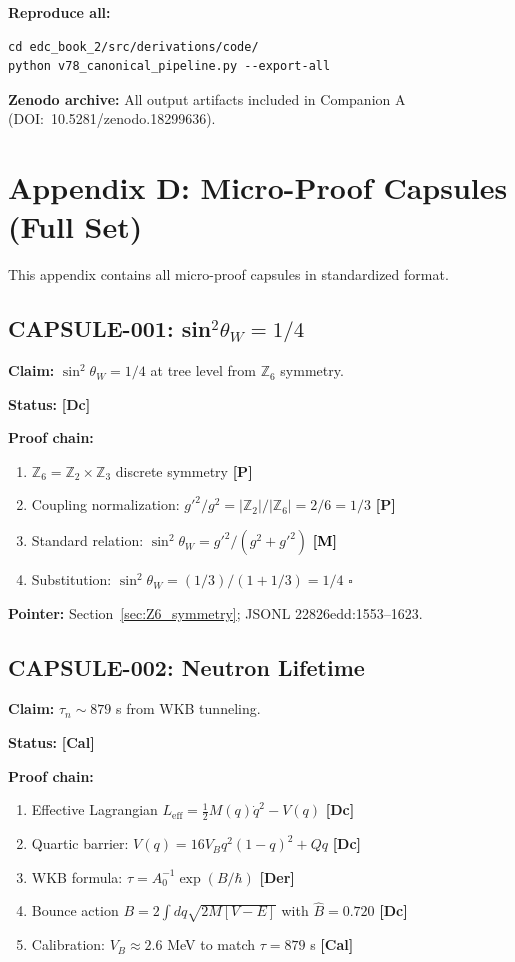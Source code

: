 \documentclass[11pt,a4paper]{article}
\newcommand{\tagP}{\textcolor{red!70!black}{\textbf{[P]}}}
\newcommand{\tagDc}{\textcolor{blue!70!black}{\textbf{[Dc]}}}
\newcommand{\tagDer}{\textcolor{green!50!black}{\textbf{[Der]}}}
\newcommand{\tagCal}{\textcolor{purple!70!black}{\textbf{[Cal]}}}
\newcommand{\tagM}{\textcolor{black}{\textbf{[M]}}}
\begin{document}
\textbf{Reproduce all:}
\begin{verbatim}
cd edc_book_2/src/derivations/code/
python v78_canonical_pipeline.py --export-all
\end{verbatim}

\textbf{Zenodo archive:} All output artifacts included in Companion A (DOI:~10.5281/zenodo.18299636).

\section{Appendix D: Micro-Proof Capsules (Full Set)}
\label{app:capsules}

This appendix contains all micro-proof capsules in standardized format.

\subsection{CAPSULE-001: sin$^2\theta_W = 1/4$}

\textbf{Claim:} $\sin^2\theta_W = 1/4$ at tree level from $\mathbb{Z}_6$ symmetry.

\textbf{Status:} \tagDc{}

\textbf{Proof chain:}
\begin{enumerate}
    \item $\mathbb{Z}_6 = \mathbb{Z}_2 \times \mathbb{Z}_3$ discrete symmetry \tagP{}
    \item Coupling normalization: $g'^2/g^2 = |\mathbb{Z}_2|/|\mathbb{Z}_6| = 2/6 = 1/3$ \tagP{}
    \item Standard relation: $\sin^2\theta_W = g'^2/(g^2+g'^2)$ \tagM{}
    \item Substitution: $\sin^2\theta_W = (1/3)/(1 + 1/3) = 1/4$ \quad $\square$
\end{enumerate}

\textbf{Pointer:} Section~\ref{sec:Z6_symmetry}; JSONL 22826edd:1553--1623.

\subsection{CAPSULE-002: Neutron Lifetime}

\textbf{Claim:} $\tau_n \sim 879$ s from WKB tunneling.

\textbf{Status:} \tagCal{}

\textbf{Proof chain:}
\begin{enumerate}
    \item Effective Lagrangian $L_{\text{eff}} = \frac{1}{2}M(q)\dot{q}^2 - V(q)$ \tagDc{}
    \item Quartic barrier: $V(q) = 16V_B q^2(1-q)^2 + Qq$ \tagDc{}
    \item WKB formula: $\tau = A_0^{-1} \exp(B/\hbar)$ \tagDer{}
    \item Bounce action $B = 2\int dq\sqrt{2M[V-E]}$ with $\hat{B} = 0.720$ \tagDc{}
    \item Calibration: $V_B \approx 2.6$ MeV to match $\tau = 879$ s \tagCal{}
\end{enumerate}
\end{document}
